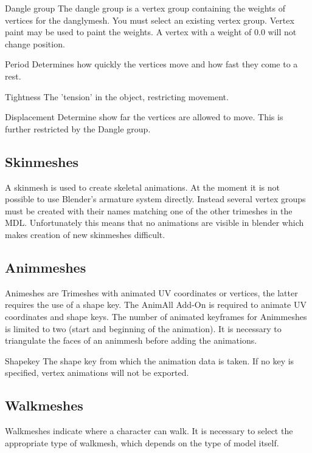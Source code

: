 \begin{propertyAurora}{Dangle group} 
The dangle group is a vertex group containing the weights of vertices for the danglymesh. 
You must select an existing vertex group. Vertex paint may be used to paint the weights. A vertex with a weight of
0.0 will not change position.
\end{propertyAurora}

\begin{propertyAurora}{Period} 
Determines how quickly the vertices move and how fast they come to a rest.
\end{propertyAurora}
\begin{propertyAurora}{Tightness} 
The 'tension' in the object, restricting movement. 
\end{propertyAurora}
\begin{propertyAurora}{Displacement} 
Determine show far the vertices are allowed to move. This is further restricted by the Dangle group.
\end{propertyAurora}


\subsection{Skinmeshes}
A skinmesh is used to create skeletal animations. At the moment it is not 
possible to use Blender's armature system directly. Instead several vertex groups 
must be created with their names matching one of the other trimeshes in the MDL. 
Unfortunately this means that no animations are visible in blender which makes
creation of new skinmeshes difficult.


\subsection{Animmeshes}
Animeshes are Trimeshes with animated UV coordinates or vertices, the latter requires the use of a 
shape key. The AnimAll Add-On is required to animate UV coordinates and shape keys. The number of 
animated keyframes for Animmeshes is limited to two (start and beginning of the animation). It is necessary 
to triangulate the faces of an animmesh before adding the animations.

\begin{propertyAurora}{Shapekey} 
    The shape key from which the animation data is taken. If no key is specified, vertex animations will
    not be exported.
\end{propertyAurora}

\subsection{Walkmeshes}
Walkmeshes indicate where a character can walk. It is necessary to select 
the appropriate type of walkmesh, which depends on the type of model itself. 

